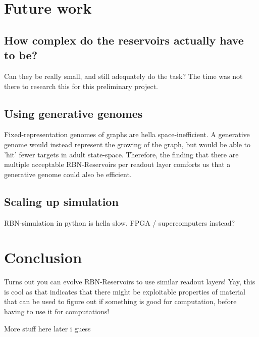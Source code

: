 \section{Future work}


\subsection{How complex do the reservoirs actually have to be?}

Can they be really small, and still adequately do the task?
The time was not there to research this for this preliminary project.

\subsection{Using generative genomes}

Fixed-representation genomes of graphs are hella space-inefficient.
A generative genome would instead represent the growing of the graph,
but would be able to 'hit' fewer targets in adult state-space.
Therefore, the finding that there are multiple acceptable RBN-Reservoirs per readout layer
comforts us that a generative genome could also be efficient.

\subsection{Scaling up simulation}

RBN-simulation in python is hella slow.
FPGA / supercomputers instead?

\section{Conclusion}


Turns out you can evolve RBN-Reservoirs to use similar readout layers!
Yay, this is cool as that indicates that there might be exploitable properties of material that can be used to figure out if something is good for computation, before having to use it for computations!

More stuff here later i guess
